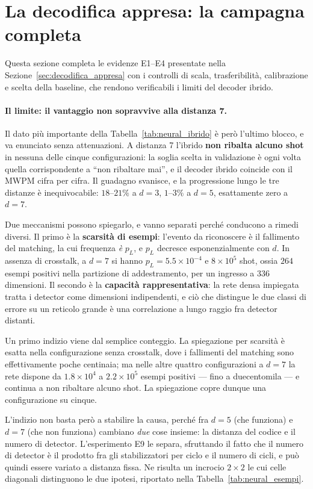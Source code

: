 \section{La decodifica appresa: la campagna completa}
\label{app:decodifica}

Questa sezione completa le evidenze E1--E4 presentate nella
Sezione~\ref{sec:decodifica_appresa} con i controlli di scala, trasferibilità,
calibrazione e scelta della baseline, che rendono verificabili i limiti del
decoder ibrido.

\paragraph{Il limite: il vantaggio non sopravvive alla distanza 7.}
Il dato più importante della Tabella~\ref{tab:neural_ibrido} è però l'ultimo blocco, e va enunciato senza attenuazioni. A distanza 7 l'ibrido \textbf{non ribalta alcuno shot} in nessuna delle cinque configurazioni: la soglia scelta in validazione è ogni volta quella corrispondente a ``non ribaltare mai'', e il decoder ibrido coincide con il \ac{MWPM} cifra per cifra. Il guadagno svanisce, e la progressione lungo le tre distanze è inequivocabile: $18$--$21\%$ a $d=3$, $1$--$3\%$ a $d=5$, esattamente zero a $d=7$.

Due meccanismi possono spiegarlo, e vanno separati perché conducono a rimedi diversi. Il primo è la \textbf{scarsità di esempi}: l'evento da riconoscere è il fallimento del matching, la cui frequenza \emph{è} $p_L$, e $p_L$ decresce esponenzialmente con $d$. In assenza di crosstalk, a $d=7$ si hanno $p_L = 5.5\times10^{-4}$ e $8\times10^5$ shot, ossia $264$ esempi positivi nella partizione di addestramento, per un ingresso a $336$ dimensioni. Il secondo è la \textbf{capacità rappresentativa}: la rete densa impiegata tratta i detector come dimensioni indipendenti, e ciò che distingue le due classi di errore su un reticolo grande è una correlazione a lungo raggio fra detector distanti.

Un primo indizio viene dal semplice conteggio. La spiegazione per scarsità è esatta nella configurazione senza crosstalk, dove i fallimenti del matching sono effettivamente poche centinaia; ma nelle altre quattro configurazioni a $d=7$ la rete dispone da $1.8\times10^4$ a $2.2\times10^5$ esempi positivi --- fino a duecentomila --- e continua a non ribaltare alcuno shot. La spiegazione copre dunque una configurazione su cinque.

L'indizio non basta però a stabilire la causa, perché fra $d=5$ (che funziona) e $d=7$ (che non funziona) cambiano \emph{due} cose insieme: la distanza del codice e il numero di detector. L'esperimento E9 le separa, sfruttando il fatto che il numero di detector è il prodotto fra gli stabilizzatori per ciclo e il numero di cicli, e può quindi essere variato a distanza fissa. Ne risulta un incrocio $2\times2$ le cui celle diagonali distinguono le due ipotesi, riportato nella Tabella~\ref{tab:neural_esempi}.

